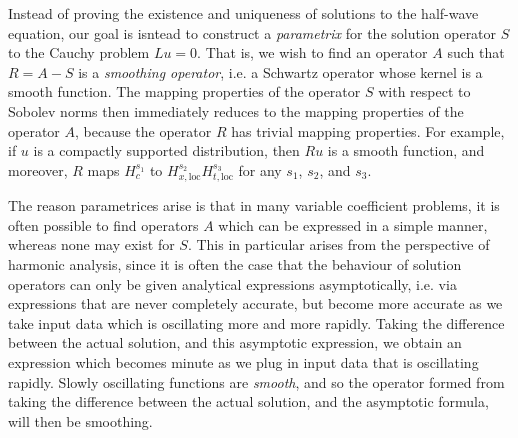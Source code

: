 \documentclass{article}
\theoremstyle{plain}
\theoremstyle{remark}
\theoremstyle{definition}
\DeclareMathOperator{\RR}{\mathbb{R}}
\begin{document}
\begin{comment}
For such an operator, we can find a countable, orthogonal basis $\{ e_\lambda : \lambda \geq 0 \}$ of $L^2(M)$, such that $Pe_\lambda = \lambda e_\lambda$, and such that for each $\lambda$, $e_\lambda$ is a smooth function, with $L^2_s$ norm $O_s(\lambda^s)$. The number of elements of this basis with eigenvalue at most $\lambda$ is $O(1 + \lambda^d)$. Given this basis, we can define a family of bounded operators $\{ e^{2 \pi itP} \}$ on $L^2(M)$ by setting $e^{2 \pi it P} e_\lambda = e^{2 \pi it \lambda} e_\lambda$, and then consider a solution operator
%
\[ (Wf)(x,t) = (e^{2 \pi it \lambda} f)(x). \]
%
Using the $L^2_s$ norm properties of the eigenfunctions $\{ e_\lambda \}$, and the fact that for any $f \in C^\infty(M)$,
%
\[ \langle f, e_\lambda \rangle \lesssim_N \lambda^{-N} \quad\text{for all $N > 0$,} \]
%
it is simple to check that $W$ maps $C^\infty(M)$ into $C^\infty_{\text{loc}}(M \times \RR)$, and that for $f \in C^\infty(M)$, the smooth function $u = Wf$ solves the equation $Lu = 0$ with initial conditions $f$. One can also prove the uniqueness of solution solutions, e.g. using energy estimates, but this takes us a little far afield of what we want to talk about in these notes.
\end{comment}

Instead of proving the existence and uniqueness of solutions to the half-wave equation, our goal is isntead to construct a \emph{parametrix} for the solution operator $S$ to the Cauchy problem $Lu = 0$. That is, we wish to find an operator $A$ such that $R = A - S$ is a \emph{smoothing operator}, i.e. a Schwartz operator whose kernel is a smooth function. The mapping properties of the operator $S$ with respect to Sobolev norms then immediately reduces to the mapping properties of the operator $A$, because the operator $R$ has trivial mapping properties. For example, if $u$ is a compactly supported distribution, then $Ru$ is a smooth function, and moreover, $R$ maps $H^{s_1}_c$ to $H^{s_2}_{x, \text{loc}} H^{s_3}_{t, \text{loc}}$ for any $s_1$, $s_2$, and $s_3$.

The reason parametrices arise is that in many variable coefficient problems, it is often possible to find operators $A$ which can be expressed in a simple manner, whereas none may exist for $S$. This in particular arises from the perspective of harmonic analysis, since it is often the case that the behaviour of solution operators can only be given analytical expressions asymptotically, i.e. via expressions that are never completely accurate, but become more accurate as we take input data which is oscillating more and more rapidly. Taking the difference between the actual solution, and this asymptotic expression, we obtain an expression which becomes minute as we plug in input data that is oscillating rapidly. Slowly oscillating functions are \emph{smooth}, and so the operator formed from taking the difference between the actual solution, and the asymptotic formula, will then be smoothing.
\end{document}
